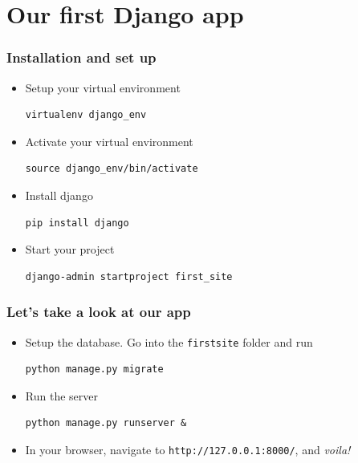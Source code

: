 \documentclass[10pt,t,xcolor=dvipsnames]{beamer}
\begin{document}
\section{Our first Django app}
\begin{frame}[fragile]
\frametitle{Installation and set up}
\begin{itemize}[<+->]
\item Setup your virtual environment
\begin{lstlisting}
virtualenv django_env
\end{lstlisting}
\item Activate your virtual environment
\begin{lstlisting}
source django_env/bin/activate
\end{lstlisting}
\item Install django
\begin{lstlisting}
pip install django
\end{lstlisting}
\item Start your project
\begin{lstlisting}
django-admin startproject first_site
\end{lstlisting}
\end{itemize}
\end{frame}
\begin{frame}[fragile]
\frametitle{Let's take a look at our app}
\begin{itemize}[<+->]
\item Setup the database. Go into the \texttt{firstsite} folder and run
\begin{lstlisting}
python manage.py migrate
\end{lstlisting}
\item Run the server
\begin{lstlisting}
python manage.py runserver &
\end{lstlisting}
\item In your browser, navigate to \texttt{http://127.0.0.1:8000/}, and \textit{voila!}
\end{itemize}
\end{frame}
\end{document}

